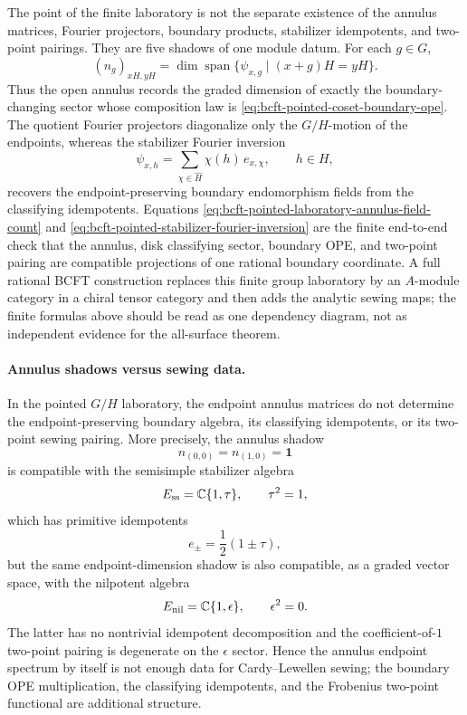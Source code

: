 The point of the finite laboratory is not the separate existence of the
annulus matrices, Fourier projectors, boundary products, stabilizer
idempotents, and two-point pairings.  They are five shadows of one module
datum.  For each \(g\in G\),
\begin{equation}
  (n_g)_{xH,yH}
  =
  \dim \operatorname{span}
  \{\psi_{x,g}\mid (x+g)H=yH\}.
  \label{eq:bcft-pointed-laboratory-annulus-field-count}
\end{equation}
Thus the open annulus records the graded dimension of exactly the
boundary-changing sector whose composition law is
\eqref{eq:bcft-pointed-coset-boundary-ope}.  The quotient Fourier projectors
diagonalize only the \(G/H\)-motion of the endpoints, whereas the stabilizer
Fourier inversion
\begin{equation}
  \psi_{x,h}
  =
  \sum_{\chi\in\widehat H}\chi(h)\,e_{x,\chi},
  \qquad h\in H,
  \label{eq:bcft-pointed-stabilizer-fourier-inversion}
\end{equation}
recovers the endpoint-preserving boundary endomorphism fields from the
classifying idempotents.  Equations
\eqref{eq:bcft-pointed-laboratory-annulus-field-count} and
\eqref{eq:bcft-pointed-stabilizer-fourier-inversion} are the finite
end-to-end check that the annulus, disk classifying sector, boundary OPE, and
two-point pairing are compatible projections of one rational boundary
coordinate.  A full rational BCFT construction replaces this finite group
laboratory by an \(A\)-module category in a chiral tensor category and then
adds the analytic sewing maps; the finite formulas above should be read as
one dependency diagram, not as independent evidence for the all-surface
theorem.

\paragraph{Annulus shadows versus sewing data.}
In the pointed \(G/H\) laboratory, the endpoint annulus matrices do not
determine the endpoint-preserving boundary algebra, its classifying idempotents,
or its two-point sewing pairing.  More precisely, the annulus shadow
\[
  n_{(0,0)}=n_{(1,0)}=\mathbf 1
\]
is compatible with the semisimple stabilizer algebra
\[
  E_{\rm ss}=\mathbb C\{1,\tau\},\qquad \tau^2=1,
\]
which has primitive idempotents
\[
  e_\pm=\frac12(1\pm\tau),
\]
but the same endpoint-dimension shadow is also compatible, as a graded vector
space, with the nilpotent algebra
\[
  E_{\rm nil}=\mathbb C\{1,\epsilon\},\qquad \epsilon^2=0.
\]
The latter has no nontrivial idempotent decomposition and the
coefficient-of-\(1\) two-point pairing is degenerate on the \(\epsilon\)
sector.  Hence the annulus endpoint spectrum by itself is not enough data for
Cardy--Lewellen sewing; the boundary OPE multiplication, the classifying
idempotents, and the Frobenius two-point functional are additional structure.

